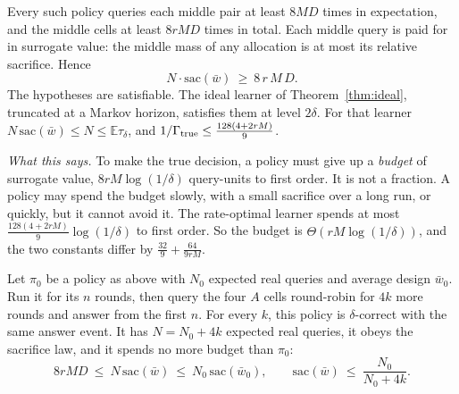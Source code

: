 \begin{theorem}
\label{thm:sacrifice}
Every such policy queries each middle pair at least $8MD$ times in expectation, and the middle
cells at least $8rMD$ times in total. Each middle query is paid for in surrogate value: the
middle mass of any allocation is at most its relative sacrifice. Hence
\[
N\cdot\mathrm{sac}(\bar w)\ \ge\ 8\,r\,M\,D .
\]
The hypotheses are satisfiable. The ideal learner of Theorem~\ref{thm:ideal}, truncated at a
Markov horizon, satisfies them at level $2\delta$. For that learner
$N\,\mathrm{sac}(\bar w)\le N\le\mathbb{E}\tau_{\delta}$, and
$1/\Gamma_{\rm true}\le\frac{128(4+2rM)}{9}$.
\end{theorem}


\emph{What this says.} To make the true decision, a policy must give up a \emph{budget} of
surrogate value, $8rM\log(1/\delta)$ query-units to first order. It is not a fraction. A policy
may spend the budget slowly, with a small sacrifice over a long run, or quickly, but it cannot
avoid it. The rate-optimal learner spends at most $\frac{128(4+2rM)}{9}\log(1/\delta)$ to first
order. So the budget is $\Theta(rM\log(1/\delta))$, and the two constants differ by
$\frac{32}{9}+\frac{64}{9rM}$.

\begin{theorem}
\label{thm:dilute}
Let $\pi_{0}$ be a policy as above with $N_{0}$ expected real queries and average design
$\bar w_{0}$. Run it for its $n$ rounds, then query the four $A$ cells round-robin for $4k$ more
rounds and answer from the first $n$. For every $k$, this policy is $\delta$-correct with the same
answer event. It has $N=N_{0}+4k$ expected real queries, it obeys the sacrifice law, and it spends
no more budget than $\pi_{0}$:
\[
8rMD\ \le\ N\,\mathrm{sac}(\bar w)\ \le\ N_{0}\,\mathrm{sac}(\bar w_{0}),\qquad
\mathrm{sac}(\bar w)\ \le\ \frac{N_{0}}{N_{0}+4k}.
\]
\end{theorem}


